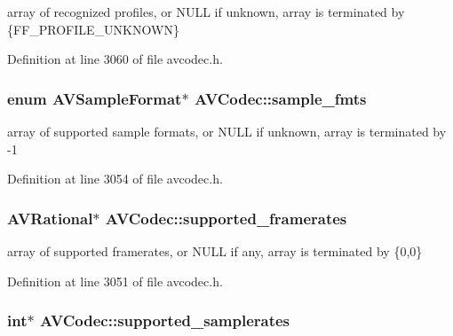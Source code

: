 array of recognized profiles, or N\+U\+LL if unknown, array is terminated by \{F\+F\+\_\+\+P\+R\+O\+F\+I\+L\+E\+\_\+\+U\+N\+K\+N\+O\+WN\} 



Definition at line 3060 of file avcodec.\+h.

\subsubsection[{\texorpdfstring{sample\+\_\+fmts}{sample_fmts}}]{\setlength{\rightskip}{0pt plus 5cm}enum {\bf A\+V\+Sample\+Format}$\ast$ A\+V\+Codec\+::sample\+\_\+fmts}\hypertarget{struct_a_v_codec_aac19f4c45370f715412ad5c7b78daacf}{}\label{struct_a_v_codec_aac19f4c45370f715412ad5c7b78daacf}


array of supported sample formats, or N\+U\+LL if unknown, array is terminated by -\/1 



Definition at line 3054 of file avcodec.\+h.

\subsubsection[{\texorpdfstring{supported\+\_\+framerates}{supported_framerates}}]{ {\bf A\+V\+Rational}$\ast$ A\+V\+Codec\+::supported\+\_\+framerates}\hypertarget{struct_a_v_codec_a5cc75a0ab41697df21a8cd649662190c}{}\label{struct_a_v_codec_a5cc75a0ab41697df21a8cd649662190c}


array of supported framerates, or N\+U\+LL if any, array is terminated by \{0,0\} 



Definition at line 3051 of file avcodec.\+h.

\subsubsection[{\texorpdfstring{supported\+\_\+samplerates}{supported_samplerates}}]{ {\bf int}$\ast$ A\+V\+Codec\+::supported\+\_\+samplerates}\hypertarget{struct_a_v_codec_aee7a194f1c3251958d3dabed3fa8148e}{}\label{struct_a_v_codec_aee7a194f1c3251958d3dabed3fa8148e}


